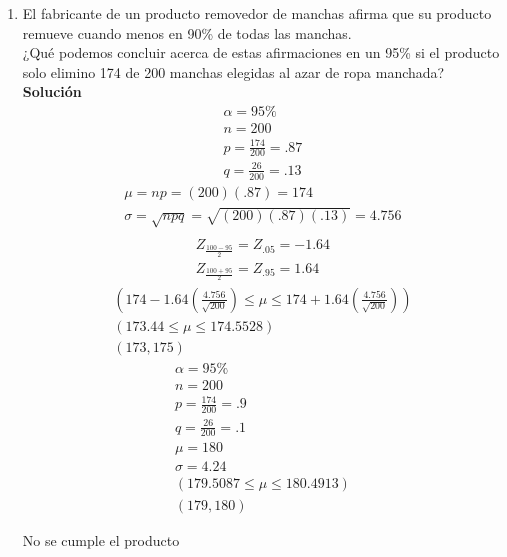 \begin{enumerate}
    \item El fabricante de un producto removedor de manchas afirma que su producto remueve cuando menos en 90\% de todas las manchas.\\
    ¿Qué podemos concluir acerca de estas afirmaciones en un  95\% si el producto solo elimino 174 de 200 manchas elegidas al azar de ropa manchada?
    \\\textbf{Solución}
    \begin{gather*}
    \alpha = 95\%\\
    n	= 200\\
    p = \frac{174}{200} = .87\\
    q = \frac{26}{200} = .13
    \end{gather*}
    \begin{gather*}
    \mu = np = (200)(.87) = 174\\
    \sigma = \sqrt{npq} = \sqrt{(200)(.87)(.13)} = 4.756\\
    \end{gather*}
    \begin{gather*}	 
    Z_{\frac{100 - 95}{2}} = Z_{.05} = -1.64\\
    Z_{\frac{100 + 95}{2}} = Z_{.95} = 1.64
    \end{gather*}
    \begin{gather*}	 
    (174 - 1.64(\frac{4.756}{\sqrt{200}}) \le \mu \le 174 + 1.64(\frac{4.756}{\sqrt{200}}))\\
    (173.44 \le \mu \le 174.5528)\\
     (173,175)
    \end{gather*}
    \begin{gather*}	 
    \alpha = 95\%\\
    n	= 200\\
    p = \frac{174}{200} = .9\\
    q = \frac{26}{200} = .1\\
    \mu = 180\\
    \sigma = 4.24\\
    (179.5087 \le \mu \le 180.4913)\\
     (179,180)
    \end{gather*}
    \begin{center}
         No se cumple el producto\\
    \end{center}
    

\end{enumerate}
